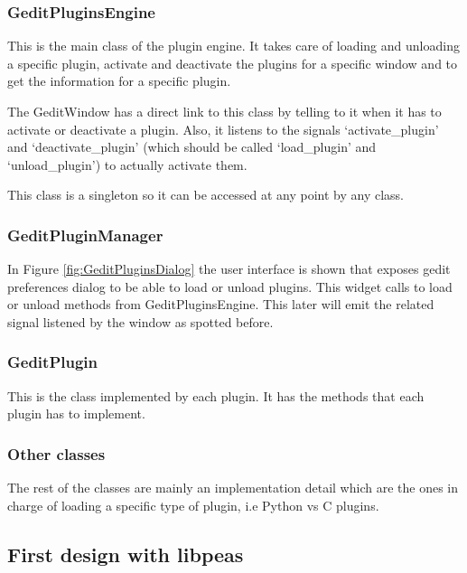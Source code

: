 \subsubsection{GeditPluginsEngine}

This is the main class of the plugin engine. It takes care of loading and unloading a specific plugin, activate and deactivate the plugins for a specific window and to get the information for a specific plugin.

The GeditWindow has a direct link to this class by telling to it when it has to activate or deactivate a plugin. Also, it listens to the signals `activate\_plugin' and `deactivate\_plugin' (which should be called `load\_plugin' and `unload\_plugin') to actually activate them.

This class is a singleton so it can be accessed at any point by any class.

\newpage
\subsubsection{GeditPluginManager}


In Figure \ref{fig:GeditPluginsDialog} the user interface is shown that  exposes gedit preferences dialog to be able 
to load or unload plugins. This widget calls to load or unload methods from GeditPluginsEngine. This later will emit 
the related signal listened by the window as spotted before.

\subsubsection{GeditPlugin}

This is the class implemented by each plugin. It has the methods that each plugin has to implement.

\subsubsection{Other classes}

The rest of the classes are mainly an implementation detail which are the ones in charge of loading a specific type of plugin, i.e Python vs C plugins.

\newpage
\subsection{First design with libpeas}

